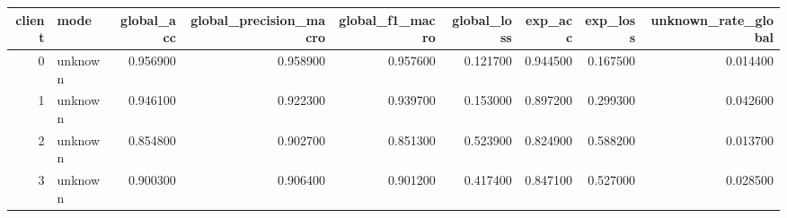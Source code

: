 \begin{tabular}{rlrrrrrrr}
\toprule
client & mode & global_acc & global_precision_macro & global_f1_macro & global_loss & exp_acc & exp_loss & unknown_rate_global \\
\midrule
0 & unknown & 0.956900 & 0.958900 & 0.957600 & 0.121700 & 0.944500 & 0.167500 & 0.014400 \\
1 & unknown & 0.946100 & 0.922300 & 0.939700 & 0.153000 & 0.897200 & 0.299300 & 0.042600 \\
2 & unknown & 0.854800 & 0.902700 & 0.851300 & 0.523900 & 0.824900 & 0.588200 & 0.013700 \\
3 & unknown & 0.900300 & 0.906400 & 0.901200 & 0.417400 & 0.847100 & 0.527000 & 0.028500 \\
\bottomrule
\end{tabular}
